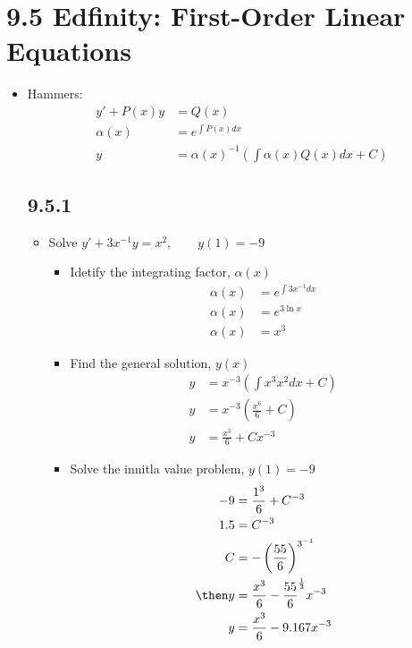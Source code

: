 \section{9.5 Edfinity: First-Order Linear Equations}
\begin{itemize}
  \item Hammers:
    \begin{align*}
      y' + P(x)y &= Q(x)  \\
      \alpha(x) &= e^{\int P(x)dx} \\
      y &= \alpha(x)^{-1}\left(\int \alpha(x)Q(x)dx + C\right)
    \end{align*}

  \subsection{9.5.1}
  \begin{itemize}
    \item Solve \(y' + 3x^{-1}y = x^2, \qquad y(1) = -9\)
      \begin{itemize}
        \item Idetify the integrating factor, \(\alpha(x)\)
          \begin{align*}
            \alpha(x) &= e^{\int 3x^{-1} dx}  \\
            \alpha(x) &= e^{3\ln x} \\
            \alpha(x) &= x^3
          \end{align*}

        \item Find the general solution, \(y(x)\)
          \begin{align*}
            y &= x^{-3}\left(\int x^3x^2 dx + C\right) \\
            y &= x^{-3}\left(\frac{x^{6}}{6} + C\right) \\
            y &= \frac{x^3}{6} + Cx^{-3}
          \end{align*}

        \item Solve the innitla value problem, \(y(1) = - 9\)
          \begin{align*}
            -9 &= \frac{1^3}{6} + C^{-3} \\
            1.5 &= C^{-3} \\
            C &= -\left(\frac{55}{6}\right)^{3^{-1}} \\
            \then
            y &= \frac{x^3}{6} -\frac{55}{6}^{\frac{1}{3}}x^{-3} \\
            y &= \frac{x^3}{6} - 9.167x^{-3} \\
          \end{align*}
      \end{itemize}
  \end{itemize}


\end{itemize}
